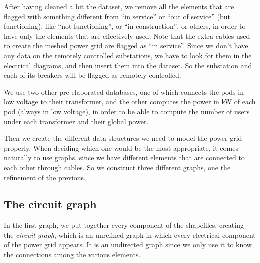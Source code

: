 After having cleaned a bit the dataset, we remove all the elements that are flagged with something different from ``in service'' or ``out of service'' (but functioning), like ``not functioning'', or ``in construction'', or others, in order to have only the elements that are effectively used. Note that the extra cables used to create the meshed power grid are flagged as ``in service''. Since we don't have any data on the remotely controlled substations, we have to look for them in the electrical diagrams, and then insert them into the dataset. So the substation and each of its breakers will be flagged as remotely controlled.

We use two other pre-elaborated databases, one of which connects the pods in low voltage to their transformer, and the other computes the power in kW of each pod (always in low voltage), in order to be able to compute the number of users under each transformer and their global power.

Then we create the different data structures we need to model the power grid properly. When deciding which one would be the most appropriate, it comes naturally to use graphs, since we have different elements that are connected to each other through cables. So we construct three different graphs, one the refinement of the previous.



\subsection{The circuit graph}

In the first graph, we put together every component of the shapefiles, creating the \emph{circuit graph}, which is an unrefined graph in which every electrical component of the power grid appears. It is an undirected graph since we only use it to know the connections among the various elements.

